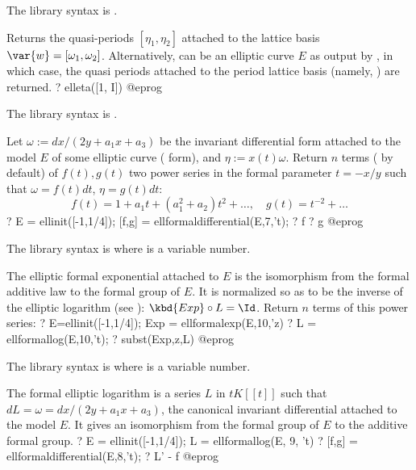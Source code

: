 The library syntax is .

\label{se:elleta}
Returns the quasi-periods $[\eta_1,\eta_2]$
attached to the lattice basis $\var{w} = [\omega_1, \omega_2]$.
Alternatively,  can be an elliptic curve $E$ as output by
, in which case, the quasi periods attached to the period
lattice basis  (namely, ) are returned.
\bprog
? elleta([1, I])
@eprog

The library syntax is .

\label{se:ellformaldifferential}
Let $\omega := dx / (2y+a_1x+a_3)$ be the invariant differential form
attached to the model $E$ of some elliptic curve ( form),
and $\eta := x(t)\omega$. Return $n$ terms ( by default)
of $f(t),g(t)$ two power series in the formal parameter $t=-x/y$ such that
$\omega = f(t) dt$, $\eta = g(t) dt$:
 $$f(t) = 1+a_1 t + (a_1^2 + a_2) t^2 + \dots,\quad
   g(t) = t^{-2} +\dots $$
 \bprog
 ? E = ellinit([-1,1/4]); [f,g] = ellformaldifferential(E,7,'t);
 ? f
 ? g
@eprog

The library syntax is  where  is a variable number.

\label{se:ellformalexp}
The elliptic formal exponential  attached to $E$ is the
isomorphism from the formal additive law to the formal group of $E$. It is
normalized so as to be the inverse of the elliptic logarithm (see
): $\kbd{Exp} \circ L = \Id$. Return $n$ terms of this
power series:
\bprog
? E=ellinit([-1,1/4]); Exp = ellformalexp(E,10,'z)
? L = ellformallog(E,10,'t);
? subst(Exp,z,L)
@eprog

The library syntax is  where  is a variable number.

\label{se:ellformallog}
The formal elliptic logarithm is a series $L$ in $t K[[t]]$
such that $d L = \omega = dx / (2y + a_1x + a_3)$, the canonical invariant
differential attached to the model $E$. It gives an isomorphism
from the formal group of $E$ to the additive formal group.
\bprog
? E = ellinit([-1,1/4]); L = ellformallog(E, 9, 't)
? [f,g] = ellformaldifferential(E,8,'t);
? L' - f
@eprog

